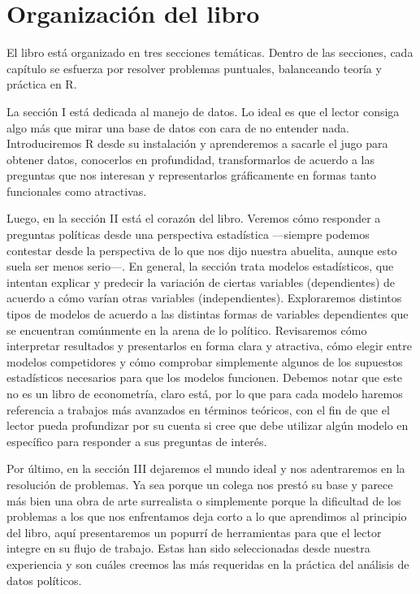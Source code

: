 \documentclass[]{book}
\begin{document}
\section{Organización del libro}\label{organizacion-del-libro}

El libro está organizado en tres secciones temáticas. Dentro de las
secciones, cada capítulo se esfuerza por resolver problemas puntuales,
balanceando teoría y práctica en R.

 La sección I está dedicada al manejo de datos. Lo ideal es que el
lector consiga algo más que mirar una base de datos con cara de no
entender nada. Introduciremos R desde su instalación y aprenderemos a
sacarle el jugo para obtener datos, conocerlos en profundidad,
transformarlos de acuerdo a las preguntas que nos interesan y
representarlos gráficamente en formas tanto funcionales como atractivas.

 Luego, en la sección II está el corazón del libro. Veremos cómo
responder a preguntas políticas desde una perspectiva estadística
---siempre podemos contestar desde la perspectiva de lo que nos dijo
nuestra abuelita, aunque esto suela ser menos serio---. En general, la
sección trata modelos estadísticos, que intentan explicar y predecir la
variación de ciertas variables (dependientes) de acuerdo a cómo varían
otras variables (independientes). Exploraremos distintos tipos de
modelos de acuerdo a las distintas formas de variables dependientes que
se encuentran comúnmente en la arena de lo político. Revisaremos cómo
interpretar resultados y presentarlos en forma clara y atractiva, cómo
elegir entre modelos competidores y cómo comprobar simplemente algunos
de los supuestos estadísticos necesarios para que los modelos funcionen.
Debemos notar que este no es un libro de econometría, claro está, por lo
que para cada modelo haremos referencia a trabajos más avanzados en
términos teóricos, con el fin de que el lector pueda profundizar por su
cuenta si cree que debe utilizar algún modelo en específico para
responder a sus preguntas de interés.

 Por último, en la sección III dejaremos el mundo ideal y nos
adentraremos en la resolución de problemas. Ya sea porque un colega nos
prestó su base y parece más bien una obra de arte surrealista o
simplemente porque la dificultad de los problemas a los que nos
enfrentamos deja corto a lo que aprendimos al principio del libro, aquí
presentaremos un popurrí de herramientas para que el lector integre en
su flujo de trabajo. Estas han sido seleccionadas desde nuestra
experiencia y son cuáles creemos las más requeridas en la práctica del
análisis de datos políticos.
\end{document}
